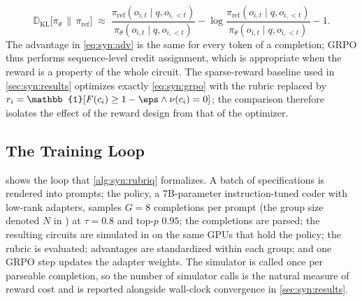 \begin{equation}\label{eq:syn:kl}
  \mathbb{D}_{\mathrm{KL}}\big[\pi_\theta\,\big\|\,\pi_{\mathrm{ref}}\big]
  \;\approx\; \frac{\pi_{\mathrm{ref}}(o_{i,t}\mid q,o_{i,<t})}{\pi_\theta(o_{i,t}\mid q,o_{i,<t})}
  -\log\frac{\pi_{\mathrm{ref}}(o_{i,t}\mid q,o_{i,<t})}{\pi_\theta(o_{i,t}\mid q,o_{i,<t})}-1 .
\end{equation}
The advantage in \cref{eq:syn:adv} is the same for every token of a completion; GRPO thus performs sequence-level credit assignment, which is appropriate when the reward is a property of the whole circuit. The sparse-reward baseline used in \cref{sec:syn:results} optimizes exactly \cref{eq:syn:grpo} with the rubric replaced by $r_i=\mathbb{1}[F(c_i)\ge 1-\eps \wedge \nu(c_i)=0]$; the comparison therefore isolates the effect of the reward design from that of the optimizer.

\subsection{The Training Loop}\label{sec:syn:loop}

 shows the loop that \cref{alg:syn:rubriq} formalizes. A batch of specifications is rendered into prompts; the policy, a 7B-parameter instruction-tuned coder with low-rank adapters, samples $G=8$ completions per prompt (the group size denoted $N$ in \cite{guo2026rubriq}) at $\tau=0.8$ and top-$p$ $0.95$; the completions are parsed; the resulting circuits are simulated in \cudaq{} on the same GPUs that hold the policy; the rubric is evaluated; advantages are standardized within each group; and one GRPO step updates the adapter weights. The simulator is called once per parseable completion, so the number of simulator calls is the natural measure of reward cost and is reported alongside wall-clock convergence in \cref{sec:syn:results}.


